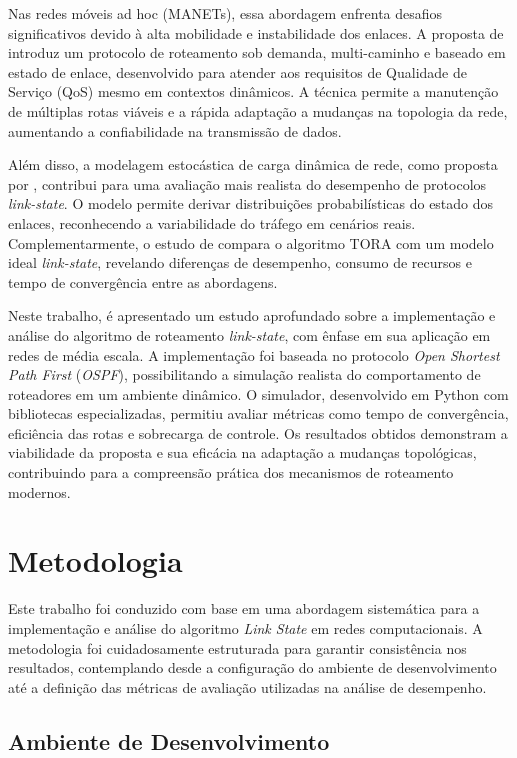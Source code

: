 \documentclass[12pt,a4paper]{report}
\begin{document}
Nas redes móveis ad hoc (MANETs), essa abordagem enfrenta desafios significativos devido à alta mobilidade e instabilidade dos enlaces. A proposta de \cite{chen2004demand} introduz um protocolo de roteamento sob demanda, multi-caminho e baseado em estado de enlace, desenvolvido para atender aos requisitos de Qualidade de Serviço (QoS) mesmo em contextos dinâmicos. A técnica permite a manutenção de múltiplas rotas viáveis e a rápida adaptação a mudanças na topologia da rede, aumentando a confiabilidade na transmissão de dados.

Além disso, a modelagem estocástica de carga dinâmica de rede, como proposta por \cite{osorio2011dynamic}, contribui para uma avaliação mais realista do desempenho de protocolos \textit{link-state}. O modelo permite derivar distribuições probabilísticas do estado dos enlaces, reconhecendo a variabilidade do tráfego em cenários reais. Complementarmente, o estudo de \cite{park1998performance} compara o algoritmo TORA com um modelo ideal \textit{link-state}, revelando diferenças de desempenho, consumo de recursos e tempo de convergência entre as abordagens.

Neste trabalho, é apresentado um estudo aprofundado sobre a implementação e análise do algoritmo de roteamento \textit{link-state}, com ênfase em sua aplicação em redes de média escala. A implementação foi baseada no protocolo \textit{Open Shortest Path First} (\textit{OSPF}), possibilitando a simulação realista do comportamento de roteadores em um ambiente dinâmico. O simulador, desenvolvido em Python com bibliotecas especializadas, permitiu avaliar métricas como tempo de convergência, eficiência das rotas e sobrecarga de controle. Os resultados obtidos demonstram a viabilidade da proposta e sua eficácia na adaptação a mudanças topológicas, contribuindo para a compreensão prática dos mecanismos de roteamento modernos.

\chapter{Metodologia}

Este trabalho foi conduzido com base em uma abordagem sistemática para a implementação e análise do algoritmo \textit{Link State} em redes computacionais. A metodologia foi cuidadosamente estruturada para garantir consistência nos resultados, contemplando desde a configuração do ambiente de desenvolvimento até a definição das métricas de avaliação utilizadas na análise de desempenho.

\section{Ambiente de Desenvolvimento}
\end{document}
